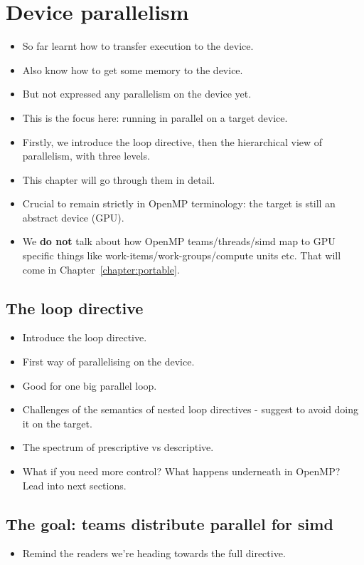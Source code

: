 
\chapter{Device parallelism}
\label{chapter:parallelism}

\begin{itemize}
  \item So far learnt how to transfer execution to the device.
  \item Also know how to get some memory to the device.
  \item But not expressed any parallelism on the device yet.
  \item This is the focus here: running in parallel on a target device.
  \item Firstly, we introduce the loop directive, then the hierarchical view of parallelism, with three levels.
  \item This chapter will go through them in detail.
  \item Crucial to remain strictly in OpenMP terminology: the target is still an abstract device (GPU).
  \item We {\bf do not} talk about how OpenMP teams/threads/simd map to GPU specific things like work-items/work-groups/compute units etc. That will come in Chapter~\ref{chapter:portable}.
\end{itemize}

\section{The loop directive}
\begin{itemize}
  \item Introduce the loop directive.
  \item First way of parallelising on the device.
  \item Good for one big parallel loop.
  \item Challenges of the semantics of nested loop directives - suggest to avoid doing it on the target.
  \item The spectrum of prescriptive vs descriptive.
  \item What if you need more control? What happens underneath in OpenMP? Lead into next sections.
\end{itemize}

\section{The goal: teams distribute parallel for simd}
\begin{itemize}
  \item Remind the readers we're heading towards the full directive.
\end{itemize}

